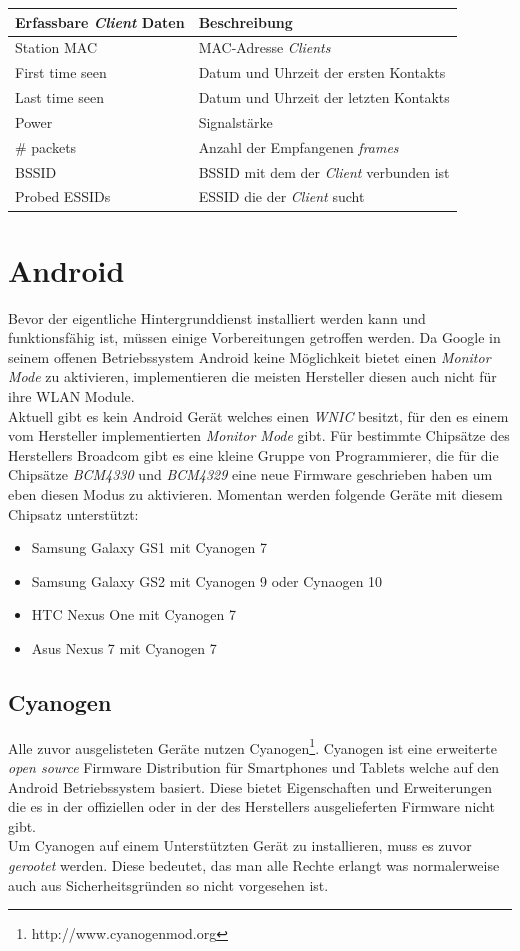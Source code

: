 \documentclass[]{report}
\begin{document}
\begin{center}
  \begin{tabulary}{\textwidth}{l | L}
\toprule
Erfassbare \textit{Client} Daten & Beschreibung \\
\midrule
Station MAC & MAC-Adresse \textit{Clients} \\
First time seen & Datum und Uhrzeit der ersten Kontakts \\
Last time seen & Datum und Uhrzeit der letzten Kontakts \\
Power & Signalstärke \\
\# packets & Anzahl der Empfangenen \textit{frames} \\
BSSID & BSSID mit dem der \textit{Client} verbunden ist \\
Probed ESSIDs & ESSID die der \textit{Client} sucht \\
\bottomrule
\end{tabulary}
\end{center}
\section{Android}
Bevor der eigentliche Hintergrunddienst installiert werden kann und funktionsfähig ist, müssen einige Vorbereitungen getroffen werden. Da Google in seinem offenen Betriebssystem Android keine Möglichkeit bietet einen \textit{Monitor Mode} zu aktivieren, implementieren die meisten Hersteller diesen auch nicht für ihre WLAN Module.\\
Aktuell gibt es kein Android Gerät welches einen \textit{WNIC} besitzt, für den es einem vom Hersteller implementierten \textit{Monitor Mode} gibt. Für bestimmte Chipsätze des Herstellers Broadcom gibt es eine kleine Gruppe von Programmierer, die für die Chipsätze \textit{BCM4330} und \textit{BCM4329} eine neue Firmware geschrieben haben um eben diesen Modus zu aktivieren. Momentan werden folgende Geräte mit diesem Chipsatz unterstützt:
\begin{itemize}
\item Samsung Galaxy GS1 mit Cyanogen 7
\item Samsung Galaxy GS2 mit Cyanogen 9 oder Cynaogen 10
\item HTC Nexus One mit Cyanogen 7
\item Asus Nexus 7 mit Cyanogen 7
\end{itemize}
\subsection{Cyanogen}
Alle zuvor ausgelisteten Geräte nutzen Cyanogen\footnote{http://www.cyanogenmod.org}. Cyanogen ist eine erweiterte \textit{open source} Firmware Distribution für Smartphones und Tablets welche auf den Android Betriebssystem basiert. Diese bietet Eigenschaften und Erweiterungen die es in der offiziellen oder in der des Herstellers ausgelieferten Firmware nicht gibt. \\
Um Cyanogen auf einem Unterstützten Gerät zu installieren, muss es zuvor \textit{gerootet} werden. Diese bedeutet, das man alle Rechte erlangt was normalerweise auch aus Sicherheitsgründen so nicht vorgesehen ist. 
\end{document}
